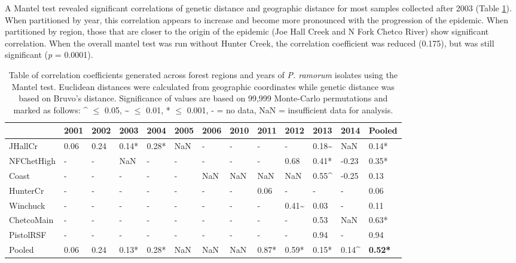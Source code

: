 \documentclass[double,11pt]{beavtex}
\begin{document}
  A Mantel test revealed significant correlations of genetic distance and
  geographic distance for most samples collected after 2003 (Table
  \ref{tab:ramorum3}). When partitioned by year, this correlation appears
  to increase and become more pronounced with the progression of the
  epidemic. When partitioned by region, those that are closer to the
  origin of the epidemic (Joe Hall Creek and N Fork Chetco River) show
  significant correlation. When the overall mantel test was run without
  Hunter Creek, the correlation coefficient was reduced (0.175), but was
  still significant (\emph{p} = 0.0001).
  
  \begin{table}
  \centering
  \caption[Table of correlation coefficients generated across
  forest regions and years of \emph{P. ramorum} isolates using the Mantel
  test.]{Table of correlation coefficients generated across
  forest regions and years of \emph{P. ramorum} isolates using the Mantel
  test. Euclidean distances were calculated from geographic coordinates
  while genetic distance was based on Bruvo's distance. Significance of
  values are based on 99,999 Monte-Carlo permutations and marked as
  follows: \^{} $\leq$ 0.05, \~{} $\leq$ 0.01, * $\leq$ 0.001, - = no data, NaN =
  insufficient data for analysis.}
  \label{tab:ramorum3}
  \begin{tabular}{@{}lllllllllllll@{}}
  \toprule
  & \textbf{2001} & \textbf{2002} & \textbf{2003} & \textbf{2004} &
  \textbf{2005} & \textbf{2006} & \textbf{2010} & \textbf{2011} &
  \textbf{2012} & \textbf{2013} & \textbf{2014} &
  \textbf{Pooled}\tabularnewline
  \midrule
  JHallCr & 0.06 & 0.24 & 0.14* & 0.28* & NaN & - & - & - & - & 0.18\~{}
  & NaN & 0.14*\tabularnewline
  NFChetHigh & - & - & NaN & - & - & - & - & - & 0.68 & 0.41* & -0.23 &
  0.35*\tabularnewline
  Coast & - & - & - & - & - & NaN & NaN & NaN & NaN & 0.55\^{} & -0.25 &
  0.13\tabularnewline
  HunterCr & - & - & - & - & - & - & - & 0.06 & - & - & - &
  0.06\tabularnewline
  Winchuck & - & - & - & - & - & - & - & - & 0.41\~{} & 0.03 & - &
  0.11\tabularnewline
  ChetcoMain & - & - & - & - & - & - & - & - & - & 0.53 & NaN &
  0.63*\tabularnewline
  PistolRSF & - & - & - & - & - & - & - & - & - & 0.94 & - &
  0.94\tabularnewline
  Pooled & 0.06 & 0.24 & 0.13* & 0.28* & NaN & NaN & NaN & 0.87* &
  0.59* & 0.15* & 0.14\^{} & \textbf{0.52*}\tabularnewline
  \bottomrule
  \end{tabular}
  \end{table}
  
\end{document}
